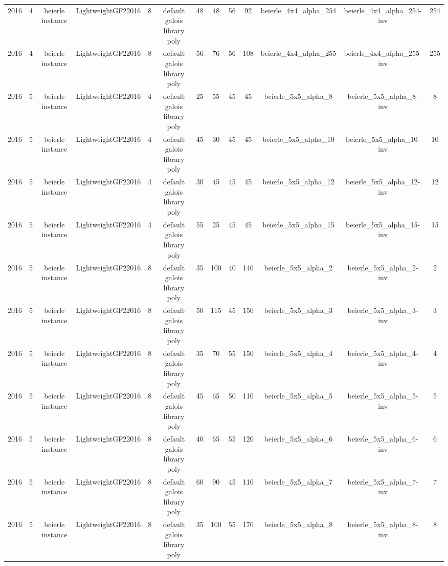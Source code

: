 \begin{tabular}{c c c c c c c c c c c c c}
2016 & 4 & beierle instance & LightweightGF22016 & 8 & default galois library poly & 48 & 48 & 56 & 92 & beierle_4x4_alpha_254 & beierle_4x4_alpha_254-inv & 254 \\
2016 & 4 & beierle instance & LightweightGF22016 & 8 & default galois library poly & 56 & 76 & 56 & 108 & beierle_4x4_alpha_255 & beierle_4x4_alpha_255-inv & 255 \\
2016 & 5 & beierle instance & LightweightGF22016 & 4 & default galois library poly & 25 & 55 & 45 & 45 & beierle_5x5_alpha_8 & beierle_5x5_alpha_8-inv & 8 \\
2016 & 5 & beierle instance & LightweightGF22016 & 4 & default galois library poly & 45 & 30 & 45 & 45 & beierle_5x5_alpha_10 & beierle_5x5_alpha_10-inv & 10 \\
2016 & 5 & beierle instance & LightweightGF22016 & 4 & default galois library poly & 30 & 45 & 45 & 45 & beierle_5x5_alpha_12 & beierle_5x5_alpha_12-inv & 12 \\
2016 & 5 & beierle instance & LightweightGF22016 & 4 & default galois library poly & 55 & 25 & 45 & 45 & beierle_5x5_alpha_15 & beierle_5x5_alpha_15-inv & 15 \\
2016 & 5 & beierle instance & LightweightGF22016 & 8 & default galois library poly & 35 & 100 & 40 & 140 & beierle_5x5_alpha_2 & beierle_5x5_alpha_2-inv & 2 \\
2016 & 5 & beierle instance & LightweightGF22016 & 8 & default galois library poly & 50 & 115 & 45 & 150 & beierle_5x5_alpha_3 & beierle_5x5_alpha_3-inv & 3 \\
2016 & 5 & beierle instance & LightweightGF22016 & 8 & default galois library poly & 35 & 70 & 55 & 150 & beierle_5x5_alpha_4 & beierle_5x5_alpha_4-inv & 4 \\
2016 & 5 & beierle instance & LightweightGF22016 & 8 & default galois library poly & 45 & 65 & 50 & 110 & beierle_5x5_alpha_5 & beierle_5x5_alpha_5-inv & 5 \\
2016 & 5 & beierle instance & LightweightGF22016 & 8 & default galois library poly & 40 & 65 & 55 & 120 & beierle_5x5_alpha_6 & beierle_5x5_alpha_6-inv & 6 \\
2016 & 5 & beierle instance & LightweightGF22016 & 8 & default galois library poly & 60 & 90 & 45 & 110 & beierle_5x5_alpha_7 & beierle_5x5_alpha_7-inv & 7 \\
2016 & 5 & beierle instance & LightweightGF22016 & 8 & default galois library poly & 35 & 100 & 55 & 170 & beierle_5x5_alpha_8 & beierle_5x5_alpha_8-inv & 8 \\

\end{tabular}
